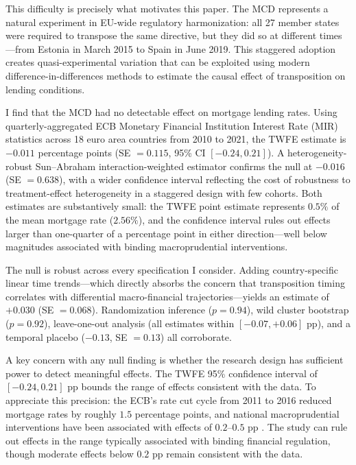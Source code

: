 \documentclass[12pt]{article}
\begin{document}
This difficulty is precisely what motivates this paper. The MCD represents a natural experiment in EU-wide regulatory harmonization: all 27 member states were required to transpose the same directive, but they did so at different times---from Estonia in March 2015 to Spain in June 2019. This staggered adoption creates quasi-experimental variation that can be exploited using modern difference-in-differences methods to estimate the causal effect of transposition on lending conditions.

I find that the MCD had no detectable effect on mortgage lending rates. Using quarterly-aggregated ECB Monetary Financial Institution Interest Rate (MIR) statistics across 18 euro area countries from 2010 to 2021, the TWFE estimate is $-0.011$ percentage points (SE $= 0.115$, 95\% CI $[-0.24, 0.21]$). A heterogeneity-robust Sun--Abraham interaction-weighted estimator confirms the null at $-0.016$ (SE $= 0.638$), with a wider confidence interval reflecting the cost of robustness to treatment-effect heterogeneity in a staggered design with few cohorts. Both estimates are substantively small: the TWFE point estimate represents $0.5\%$ of the mean mortgage rate ($2.56\%$), and the confidence interval rules out effects larger than one-quarter of a percentage point in either direction---well below magnitudes associated with binding macroprudential interventions.

The null is robust across every specification I consider. Adding country-specific linear time trends---which directly absorbs the concern that transposition timing correlates with differential macro-financial trajectories---yields an estimate of $+0.030$ (SE $= 0.068$). Randomization inference ($p = 0.94$), wild cluster bootstrap ($p = 0.92$), leave-one-out analysis (all estimates within $[-0.07, +0.06]$ pp), and a temporal placebo ($-0.13$, SE $= 0.13$) all corroborate.

A key concern with any null finding is whether the research design has sufficient power to detect meaningful effects. The TWFE 95\% confidence interval of $[-0.24, 0.21]$ pp bounds the range of effects consistent with the data. To appreciate this precision: the ECB's rate cut cycle from 2011 to 2016 reduced mortgage rates by roughly $1.5$ percentage points, and national macroprudential interventions have been associated with effects of $0.2$--$0.5$ pp \citep{cerutti_2017_macropru}. The study can rule out effects in the range typically associated with binding financial regulation, though moderate effects below $0.2$ pp remain consistent with the data.
\end{document}
